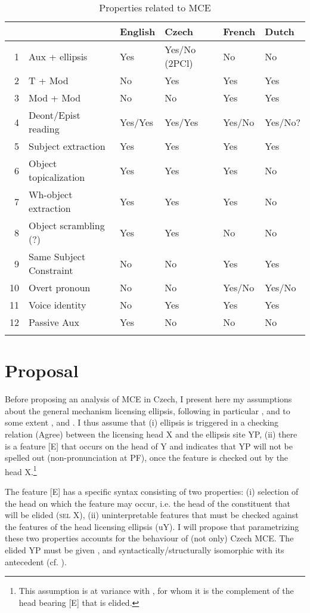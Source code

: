 \documentclass[output=paper,colorlinks,citecolor=brown,
modfonts
]{langscibook}
\begin{document}
\begin{table}
\caption{Properties related to MCE}
\label{tab:1:properties}
 \begin{tabularx}{\textwidth}{rlXXXX}\lsptoprule
    & & English & Czech & French & Dutch\\ \midrule
1 & Aux + ellipsis & Yes & Yes/No (2PCl) & No & No \\
2 & T + Mod & No & Yes & Yes & Yes\\
3 & Mod + Mod & No & No & Yes & Yes\\
4 & Deont/Epist reading & Yes/Yes & Yes/Yes & Yes/No & Yes/No?\\
5 & Subject extraction & Yes & Yes & Yes & Yes\\
6 & Object topicalization & Yes & Yes & Yes & No\\
7 & Wh-object extraction & Yes & Yes & Yes & No\\
8 & Object scrambling (?) & Yes & Yes & No & No\\
9 & Same Subject Constraint & No & No & Yes & Yes\\
10 & Overt pronoun & No & No & Yes/No & Yes/No\\
11 & Voice identity & No & Yes & Yes & Yes\\
12 & Passive Aux & Yes & No & No & No\\ \lspbottomrule
\end{tabularx}
\end{table}

\section{Proposal} \label{sec:5} 

Before proposing an analysis of MCE in Czech, I present here my assumptions about the general mechanism licensing ellipsis, following in particular \cite{Aelbrecht2010}, and to some extent \cite{Lobeck1995}, \cite{Merchant2001} and \cite{Craenenbroeck-Lipták2013}. I thus assume that (i) ellipsis is triggered in a checking relation (Agree) between the licensing head X and the ellipsis site YP, (ii) there is a feature [E] that occurs on the head of Y and indicates that YP will not be spelled out (non-pronunciation at PF), once the feature is checked out by the head X.\footnote{This assumption is at variance with \cite{Merchant2001}, for whom it is the complement of the head bearing [E] that is elided.}

The feature [E] has a specific syntax consisting of two properties: 
(i) selection of the head on which the feature may occur, i.e. the head of the constituent that will be elided (\textsc{sel} X), (ii) uninterpretable features that must be checked against the features of the head licensing ellipsis (uY). I will propose that parametrizing these two properties accounts for the behaviour of (not only) Czech MCE. The elided YP must be given \citep{Barbiers1995,Lobeck1995,Merchant2001}, and syntactically/structurally isomorphic with its antecedent (cf. \citealt{fiengo1994indices}).
\end{document}
